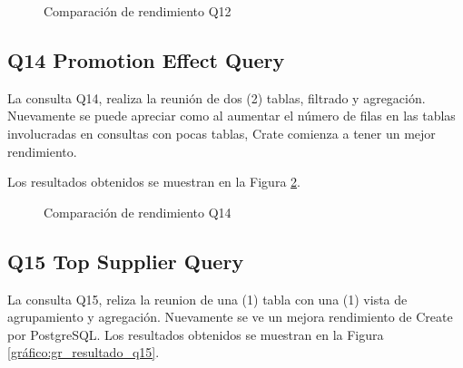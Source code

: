 \documentclass[11pt, twocolumns]{article}
\begin{document}
\begin{multicols}{2}
\begin{figure}[H]
    \caption{Comparación de rendimiento Q12}
	\label{gráfico:gr_resultado_q12}
\end{figure}


\subsection{Q14 Promotion Effect Query}
La consulta Q14, realiza la reunión de dos (2) tablas, filtrado y agregación. Nuevamente se puede apreciar como al aumentar el número de filas en las tablas involucradas en consultas con pocas tablas, Crate comienza a tener un mejor rendimiento.
\par
Los resultados obtenidos se muestran en la Figura \ref{gráfico:gr_resultado_q14}.

\begin{figure}[H]
    \caption{Comparación de rendimiento Q14}
	\label{gráfico:gr_resultado_q14}
\end{figure}


\subsection{Q15 Top Supplier Query}
La consulta Q15, reliza la reunion de una (1) tabla con una (1) vista de agrupamiento y agregación. Nuevamente se ve un mejora rendimiento de Create por PostgreSQL.
Los resultados obtenidos se muestran en la Figura \ref{gráfico:gr_resultado_q15}.


\end{multicols}
\end{document}
